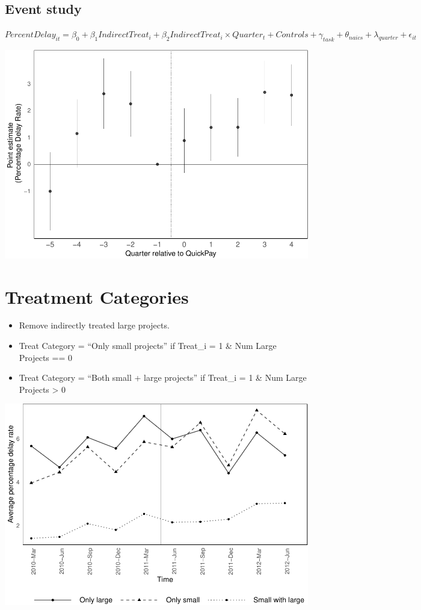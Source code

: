 \documentclass[
]{article}
\providecommand{\tightlist}{%
  \setlength{\itemsep}{0pt}\setlength{\parskip}{0pt}}
\begin{document}
\hypertarget{event-study}{%
\subsection{Event study}\label{event-study}}

\(PercentDelay_{it}=\beta_0 + \beta_1 Indirect Treat_i + \beta_2 Indirect Treat_i \times Quarter_t + Controls + \gamma_{task} + \theta_{naics}+\lambda_{quarter}+\epsilon_{it}\)

\includegraphics{parallel_trends_indirect_treat_files/figure-latex/event_study-1.pdf}

\hypertarget{treatment-categories}{%
\section{Treatment Categories}\label{treatment-categories}}

\begin{itemize}
\tightlist
\item
  Remove indirectly treated large projects.
\item
  Treat Category = ``Only small projects'' if Treat\_i = 1 \& Num Large
  Projects == 0
\item
  Treat Category = ``Both small + large projects'' if Treat\_i = 1 \&
  Num Large Projects \textgreater{} 0
\end{itemize}

\includegraphics{parallel_trends_indirect_treat_files/figure-latex/delay_plot_treat_groups-1.pdf}
\end{document}
